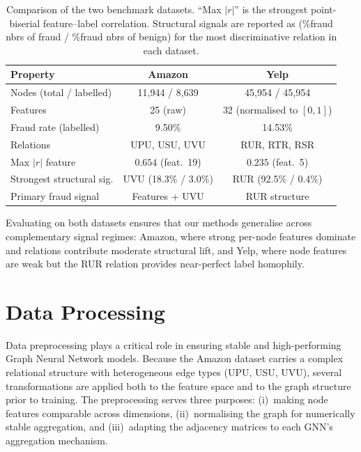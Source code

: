 \begin{table}[h!]
\centering
\begin{tabular}{lcc}
\hline
\textbf{Property} & \textbf{Amazon} & \textbf{Yelp} \\
\hline
Nodes (total / labelled)  & 11{,}944 / 8{,}639 & 45{,}954 / 45{,}954 \\
Features                  & 25 (raw)           & 32 (normalised to $[0,1]$) \\
Fraud rate (labelled)     & 9.50\%             & 14.53\% \\
Relations                 & UPU, USU, UVU      & RUR, RTR, RSR \\
Max $|r|$ feature         & $0.654$ (feat.\ 19) & $0.235$ (feat.\ 5) \\
Strongest structural sig. & UVU (18.3\% / 3.0\%) & RUR (92.5\% / 0.4\%) \\
Primary fraud signal      & Features + UVU     & RUR structure \\
\hline
\end{tabular}
\caption{Comparison of the two benchmark datasets. ``Max $|r|$'' is the strongest point-biserial feature--label correlation. Structural signals are reported as (\%fraud nbrs of fraud / \%fraud nbrs of benign) for the most discriminative relation in each dataset.}
\end{table}

\noindent
Evaluating on both datasets ensures that our methods generalise across complementary signal regimes: Amazon, where strong per-node features dominate and relations contribute moderate structural lift, and Yelp, where node features are weak but the RUR relation provides near-perfect label homophily.


\section{Data Processing}
\label{sec:data-processing}
\vspace{1\baselineskip}

Data preprocessing plays a critical role in ensuring stable and high-performing Graph Neural Network models. Because the Amazon dataset carries a complex relational structure with heterogeneous edge types (UPU, USU, UVU), several transformations are applied both to the feature space and to the graph structure prior to training. The preprocessing serves three purposes: (i)~making node features comparable across dimensions, (ii)~normalising the graph for numerically stable aggregation, and (iii)~adapting the adjacency matrices to each GNN's aggregation mechanism.

